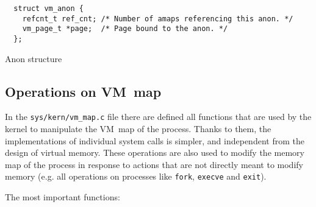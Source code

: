 \begin{listing}[h]
  \begin{verbatim}
  struct vm_anon {
    refcnt_t ref_cnt; /* Number of amaps referencing this anon. */
    vm_page_t *page;  /* Page bound to the anon. */
  };
  \end{verbatim}
  \caption{Anon structure}
  \label{impl:vm_anon}
\end{listing}

\subsection{Operations on VM~map}

In the \texttt{sys/kern/vm_map.c} file there are defined all functions that are used by the kernel to manipulate the VM~map of the process.
Thanks to them, the implementations of individual system calls is simpler, and independent from the design of virtual memory.
These operations are also used to modify the memory map of the process in response to actions that are not directly meant to modify memory
(e.g. all operations on processes like \texttt{fork}, \texttt{execve} and \texttt{exit}).

The most important functions:

